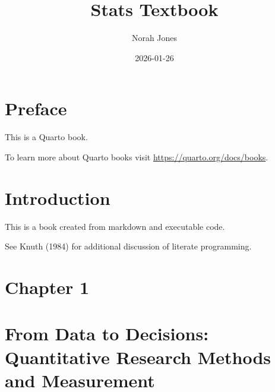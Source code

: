 \documentclass[
  letterpaper,
  DIV=11,
  numbers=noendperiod]{scrreprt}
\title{Stats Textbook}
\author{Norah Jones}
\date{2026-01-26}
\renewcommand*\contentsname{Table of contents}
\newcommand\contentsname{Table of contents}
\begin{document}
\maketitle

\renewcommand*\contentsname{Table of contents}
{
\hypersetup{linkcolor=}
\setcounter{tocdepth}{2}
\tableofcontents
}


\chapter*{Preface}\label{preface}


This is a Quarto book.

To learn more about Quarto books visit
\url{https://quarto.org/docs/books}.


\chapter*{Introduction}\label{introduction}


This is a book created from markdown and executable code.

See Knuth (1984) for additional discussion of literate programming.


\chapter{Chapter 1}\label{chapter-1}


\chapter*{From Data to Decisions: Quantitative Research Methods and
Measurement}\label{from-data-to-decisions-quantitative-research-methods-and-measurement}

\end{document}
